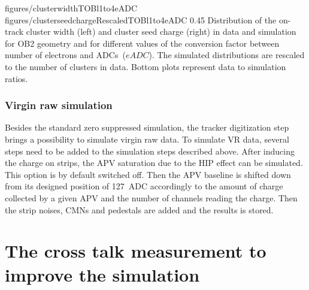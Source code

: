                  {figures/clusterwidthTOBl1to4eADC}
                 {figures/clusterseedchargeRescaledTOBl1to4eADC} %
                 {0.45}       %
                 { Distribution of the on-track cluster width (left) and cluster seed charge (right) in data and simulation for OB2 geometry and for different values of the conversion factor between number of electrons and ADCs~($eADC$).  The simulated distributions are rescaled to the number of clusters in data.  Bottom plots represent data to simulation ratios. }

 
\subsubsection{Virgin raw simulation~\label{sec:VRsimu}}

Besides the standard zero suppressed simulation, the tracker digitization step brings a possibility to simulate virgin raw data. To simulate VR data, several steps need to be added to the simulation steps described above. After inducing the charge on strips, the APV saturation due to the HIP effect can be simulated. This option is by default switched off. Then the APV baseline is shifted down from its designed position of 127~ADC accordingly to the amount of charge collected by a given APV and the number of channels reading the charge. Then the strip noises, CMNs and pedestals are added and the results is stored.


\newpage

\section{The cross talk measurement to improve the simulation~\label{sec:xtalk}}

